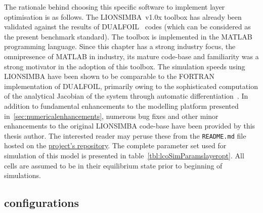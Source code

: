 The  rationale  behind  choosing  this  specific  software  to  implement  layer
optimisation  is  as  follows.  The LIONSIMBA~v1.0x  toolbox  has  already  been
validated against  the results of DUALFOIL~\cite{Dualfoil1998}  codes (which can
be considered as the present benchmark  standard). The toolbox is implemented in
the  MATLAB programming  language.  Since  this chapter  has  a strong  industry
focus,  the  omnipresence  of  MATLAB  in industry,  its  mature  code-base  and
familiarity  was  a strong  motivator  in  the  adoption  of this  toolbox.  The
simulation  speeds using  LIONSIMBA  have been  shown to  be  comparable to  the
FORTRAN  implementation  of  DUALFOIL,  primarily  owing  to  the  sophisticated
computation  of  the  analytical  Jacobian   of  the  system  through  automatic
differentiation~\cite{Torchio2016}.  In  addition  to  fundamental  enhancements
to   the  modelling   platform  presented   in~\cref{sec:numericalenhancements},
numerous  bug fixes  and  other  minor enhancements  to  the original  LIONSIMBA
code-base   have  been   provided  by   this  thesis   author.  The   interested
reader  may  peruse  these  from  the  \texttt{README.md}  file  hosted  on  the
\href{https://github.com/lionsimbatoolbox/LIONSIMBA}{project's  repository}. The
complete  parameter set  used  for  simulation of  this  model  is presented  in
table~\ref{tbl:lcoSimParamslayeropt}.  All  cells are  assumed  to  be in  their
equilibrium state prior to beginning of simulations.



\subsection{ configurations}




